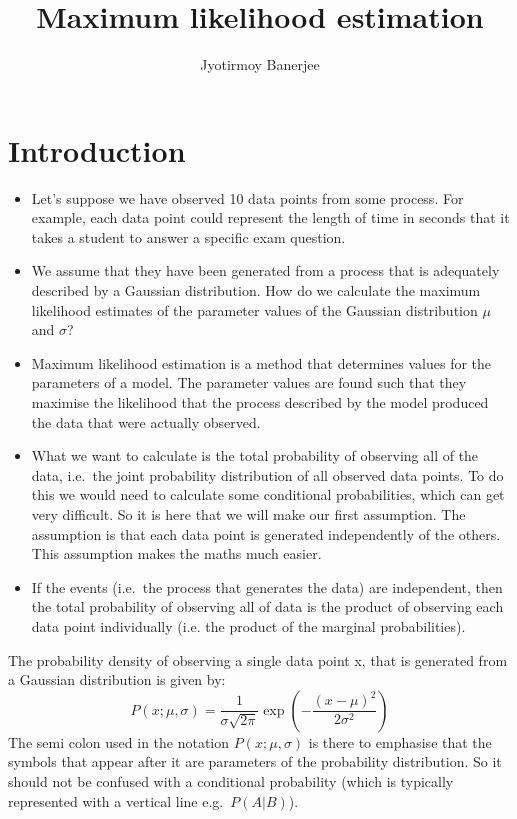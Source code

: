 \documentclass{article}
\title{Maximum likelihood estimation}
\author{Jyotirmoy Banerjee}
\begin{document}
\maketitle
\section{Introduction}

\begin{itemize}
\item Let's suppose we have observed 10 data points from some process. For example, each data point could represent the length of time in seconds that it takes a student to answer a specific exam question.
\item We assume that they have been generated from a process that is adequately described by a Gaussian distribution. How do we calculate the maximum likelihood estimates of the parameter values of the Gaussian distribution $\mu$ and $\sigma$?
\item Maximum likelihood estimation is a method that determines values for the parameters of a model. The parameter values are found such that they maximise the likelihood that the process described by the model produced the data that were actually observed.
\item What we want to calculate is the total probability of observing all of the data, i.e.\ the joint probability distribution of all observed data points. To do this we would need to calculate some conditional probabilities, which can get very difficult. So it is here that we will make our first assumption. The assumption is that each data point is generated independently of the others. This assumption makes the maths much easier. 
\item If the events (i.e.\ the process that generates the data) are independent, then the total probability of observing all of data is the product of observing each data point individually (i.e. the product of the marginal probabilities).
\end{itemize}



The probability density of observing a single data point x, that is generated from a Gaussian distribution is given by:
\[
P(x;\mu,\sigma) = \frac{1}{\sigma\sqrt{2\pi}} \exp \left( -\frac{(x-\mu)^2}{2\sigma^2} \right)
\]
The semi colon used in the notation $P(x; \mu, \sigma)$ is there to emphasise that the symbols that appear after it are parameters of the probability distribution. So it should not be confused with a conditional probability (which is typically represented with a vertical line e.g.\ $P(A| B)$).
\end{document}
